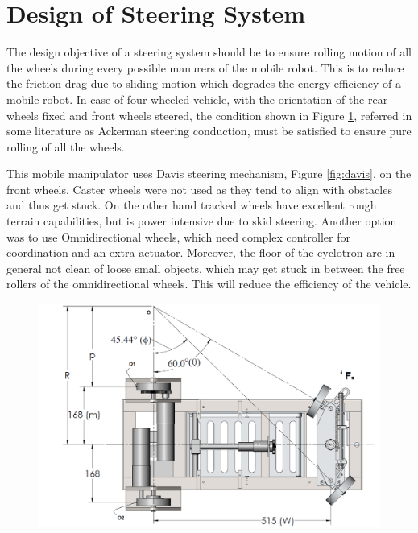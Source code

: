 \section{Design of Steering System }
The design objective of a steering system should be to ensure rolling motion of all the  wheels during every possible manurers of the mobile robot. This is  to reduce the friction drag due to sliding motion which degrades the energy efficiency of a mobile robot. In case of four wheeled vehicle, with the orientation of the rear wheels fixed and front wheels steered, the condition   shown in Figure \ref{fig:steerCond},  referred in some literature as Ackerman steering conduction, must be satisfied to ensure pure rolling of all the wheels.   

This mobile manipulator uses Davis steering mechanism,  Figure \ref{fig:davis},  on the front wheels. Caster wheels  were not used as they tend to align with  obstacles and thus get stuck. On the  other hand tracked wheels have excellent rough terrain capabilities, but is power intensive due to skid steering. Another option was to use   Omnidirectional wheels, which need complex controller for coordination and an extra actuator. Moreover, the  floor of the cyclotron are  in general not clean of loose small objects, which may get stuck in between the free rollers of the omnidirectional wheels. This will reduce the efficiency of the vehicle.  

\begin{figure}
 	\centering
	\includegraphics[width=\linewidth,keepaspectratio]{Chapter3/fig/steerringCondition}
	\label{fig:steerCond} 
\end{figure} 
 

